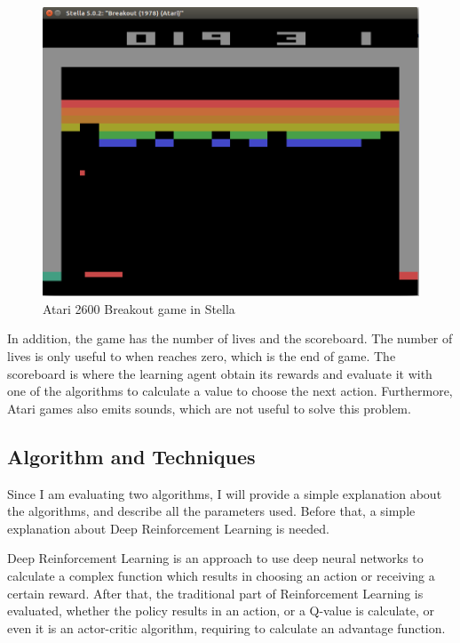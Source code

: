 \documentclass[11pt,twoside,a4paper]{article}
\begin{document}
\begin{figure}[H]
  \includegraphics[scale=0.25]{images/breakout-01.png}
  \centering
  \caption{Atari 2600 Breakout game in Stella}
  \label{fig:breakout-01}
\end{figure}

In addition, the game has the number of lives and the scoreboard. The number of
lives is only useful to when reaches zero, which is the end of game. The
scoreboard is where the learning agent obtain its rewards and evaluate it with
one of the algorithms to calculate a value to choose the next action.
Furthermore, Atari games also emits sounds, which are not useful to solve this
problem.

\subsection*{Algorithm and Techniques}

Since I am evaluating two algorithms, I will provide a simple explanation
about the algorithms, and describe all the parameters used. Before that, a
simple explanation about Deep Reinforcement Learning is needed.

Deep Reinforcement Learning is an approach to use deep neural networks to
calculate a complex function which results in choosing an action or receiving a
certain reward. After that, the traditional part of Reinforcement Learning is
evaluated, whether the policy results in an action, or a Q-value is calculate,
or even it is an actor-critic algorithm, requiring to calculate an advantage
function.
\end{document}
